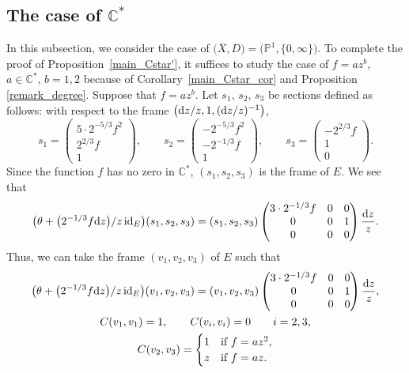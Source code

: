 \documentclass[pdftex]{sigma}
\numberwithin{equation}{section}
\newcommand{\C}{\mathbb{C}}
\newcommand{\id}{\mathrm{id}}
\begin{document}
\subsection[The case of C*]{The case of $\boldsymbol{\C^*}$}
In this subsection, we consider the case of $\bigl(\overline{X},D\bigr)=\bigl(\mathbb{P}^1,\{0,\infty\}\bigr)$.
To complete the proof of Proposition~\ref{main_Cstar'}, it suffices to study the case of $f=az^b$, $a\in \C^*$, $b=1,2$ because of Corollary~\ref{main_Cstar_cor} and Proposition \ref{remark_degree}. Suppose that $f=az^b$.
Let $s_1$, $s_2$, $s_3$ be sections defined as follows: with respect to the frame $\big({\rm d}z/z,1,({\rm d}z/z)^{-1}\big)$,
\begin{equation*}
 s_1 = \begin{pmatrix}
 5\cdot 2^{-5/3}f^2 \\
 2^{2/3} f \\
 1
 \end{pmatrix}, \qquad
 s_2 = \begin{pmatrix}
 -2^{-5/3}f^2 \\
 -2^{-1/3} f \\
 1
 \end{pmatrix},\qquad
 s_3 = \begin{pmatrix}
 -2^{2/3}f \\
 1 \\
 0
 \end{pmatrix}.
\end{equation*}
Since the function $f$ has no zero in $\C^*$, $(s_1,s_2,s_3)$ is the frame of $E$. We see that
\begin{equation*}
 \big(\theta+\big(2^{-1/3}f {\rm d}z\big)/z\,\id_E\big)(s_1,s_2,s_3) = (s_1,s_2,s_3) \begin{pmatrix}
 3\cdot 2^{-1/3}f & 0 & 0\\
 0 & 0 & 1 \\
 0 & 0 & 0
 \end{pmatrix}\frac{{\rm d}z}{z}.
\end{equation*}
Thus, we can take the frame $(v_1,v_2,v_3)$ of $E$ such that
\begin{gather*}
 \big(\theta+\big(2^{-1/3}f {\rm d}z\big)/z\,\id_E\big)(v_1,v_2,v_3) = (v_1,v_2,v_3) \begin{pmatrix}
 3\cdot 2^{-1/3}f & 0 & 0\\
 0 & 0 & 1 \\
 0 & 0 & 0
 \end{pmatrix}\frac{{\rm d}z}{z},\\
 C(v_1,v_1)=1,\qquad C(v_i,v_i)=0\qquad i=2,3,\\
 C(v_2,v_3)=\begin{cases}
 1 & \text{if $f=az^2$},\\
 z & \text{if $f=az$}.
 \end{cases}
\end{gather*}
\end{document}
